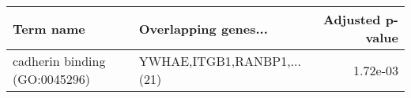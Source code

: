 \begin{tabular}{llr}
\toprule
                    Term name &       Overlapping genes... &  Adjusted p-value \\
\midrule
cadherin binding (GO:0045296) & YWHAE,ITGB1,RANBP1,...(21) &          1.72e-03 \\
\bottomrule
\end{tabular}
